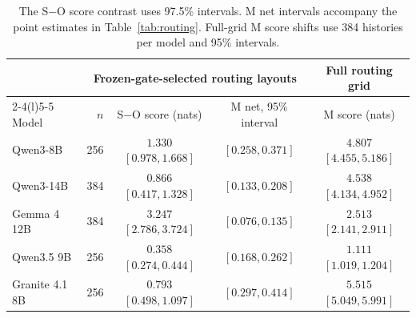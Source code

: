 \begin{table}[t]
\centering
\begin{tabular}{@{}lrccc@{}}
\toprule
& \multicolumn{3}{c}{Frozen-gate-selected routing layouts} & Full routing grid \\
\cmidrule(lr){2-4}\cmidrule(l){5-5}
Model & $n$ & S$-$O score (nats) & M net, 95\% interval & M score (nats) \\
\midrule
Qwen3-8B & 256 & $1.330$ $[0.978, 1.668]$ & $[0.258, 0.371]$ & $4.807$ $[4.455, 5.186]$ \\
Qwen3-14B & 384 & $0.866$ $[0.417, 1.328]$ & $[0.133, 0.208]$ & $4.538$ $[4.134, 4.952]$ \\
Gemma 4 12B & 384 & $3.247$ $[2.786, 3.724]$ & $[0.076, 0.135]$ & $2.513$ $[2.141, 2.911]$ \\
Qwen3.5 9B & 256 & $0.358$ $[0.274, 0.444]$ & $[0.168, 0.262]$ & $1.111$ $[1.019, 1.204]$ \\
Granite 4.1 8B & 256 & $0.793$ $[0.498, 1.097]$ & $[0.297, 0.414]$ & $5.515$ $[5.049, 5.991]$ \\
\bottomrule
\end{tabular}
\caption{The S$-$O score contrast uses 97.5\% intervals. M net intervals accompany the point estimates in Table~\ref{tab:routing}. Full-grid M score shifts use 384 histories per model and 95\% intervals.}
\label{tab:effects}
\end{table}
